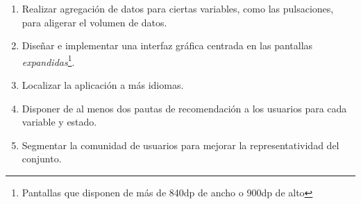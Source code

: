 \begin{enumerate}
{    Carried Forward}, \textit{Next Observation Carried Backward}... \cite{gupta_null_nodate}
    \item Realizar agregación de datos para ciertas variables, como las pulsaciones, para aligerar el volumen de datos.
    \item Diseñar e implementar una interfaz gráfica centrada en las pantallas \textit{expandidas}\footnote{Pantallas 
    que disponen de más de 840dp de ancho o 900dp de alto}.
    \item Localizar la aplicación a más idiomas.
    \item Disponer de al menos dos pautas de recomendación a los usuarios para cada variable y estado.
    \item Segmentar la comunidad de usuarios para mejorar la representatividad del conjunto.
\end{enumerate}
